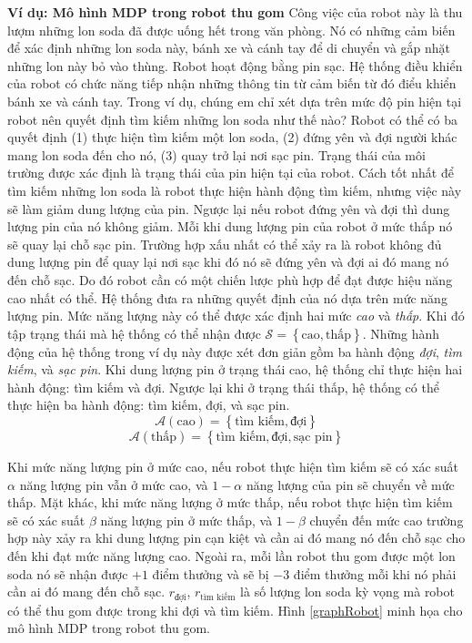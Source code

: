 \textbf{Ví dụ: Mô hình MDP trong robot thu gom} Công việc của robot này là thu lượm những lon soda đã được uống hết trong văn phòng. Nó có những cảm biến để xác định những lon soda này, bánh xe và cánh tay để di chuyển và gắp nhặt những lon này bỏ vào thùng. Robot hoạt động bằng pin sạc. Hệ thống điều khiển của robot có chức năng tiếp nhận những thông tin từ cảm biến từ đó điểu khiển bánh xe và cánh tay. Trong ví dụ, chúng em chỉ xét dựa trên mức độ pin hiện tại robot nên quyết định tìm kiếm những lon soda như thế nào? Robot có thể có ba quyết định (1) thực hiện tìm kiếm một lon soda, (2) đứng yên và đợi người khác mang lon soda đến cho nó, (3) quay trở lại nơi sạc pin. Trạng thái của môi trường được xác định là trạng thái của pin hiện tại của robot. Cách tốt nhất để tìm kiếm những lon soda là robot thực hiện hành động tìm kiếm, nhưng việc này sẽ làm giảm dung lượng của pin. Ngược lại nếu robot đứng yên và đợi thì dung lượng pin của nó không giảm. Mỗi khi dung lượng pin của robot ở mức thấp nó sẽ quay lại chỗ sạc pin. Trường hợp xấu nhất có thể xảy ra là robot không đủ dung lượng pin để quay lại nơi sạc khi đó nó sẽ đứng yên và đợi ai đó mang nó đến chỗ sạc. Do đó robot cần có một chiến lược phù hợp để đạt được hiệu năng cao nhất có thể.
Hệ thống đưa ra những quyết định của nó dựa trên mức năng lượng pin. Mức năng lượng này có thể được xác định hai mức \textit{cao} và \textit{thấp}. Khi đó tập trạng thái mà hệ thống có thể nhận được $\mathcal{S} = \left \{\text{cao}, \text{thấp} \right \}$. Những hành động của hệ thống trong ví dụ này được xét đơn giản gồm ba hành động \textit{đợi}, \textit{tìm kiếm}, và \textit{sạc pin}. Khi dung lượng pin ở trạng thái cao, hệ thống chỉ thực hiện hai hành động: tìm kiếm và đợi. Ngược lại khi ở trạng thái thấp, hệ thống có thể thực hiện ba hành động: tìm kiếm, đợi, và sạc pin.
$$\mathcal{A}(\text{cao}) =  \left \{\text{tìm kiếm}, \text{đợi} \right \}$$
$$\mathcal{A}(\text{thấp}) =  \left \{\text{tìm kiếm}, \text{đợi}, \text{sạc pin} \right \}$$

Khi mức năng lượng pin ở mức cao, nếu robot thực hiện tìm kiếm sẽ có xác suất $\alpha$ năng lượng pin vẫn ở mức cao, và $1 - \alpha$ năng lượng của pin sẽ chuyển về mức thấp. Mặt khác, khi mức năng lượng ở mức thấp, nếu robot thực hiện tìm kiếm sẽ có xác suất $\beta$ năng lượng pin ở mức thấp, và $1 - \beta$ chuyển đến mức cao trường hợp này xảy ra khi dung lượng pin cạn kiệt và cần ai đó mang nó đến chỗ sạc cho đến khi đạt mức năng lượng cao. Ngoài ra, mỗi lần robot thu gom được một lon soda nó sẽ nhận được $+1$ điểm thưởng và sẽ bị $-3$ điểm thưởng mỗi khi nó phải cần ai đó mang đến chỗ sạc. $r_{\text{đợi}}$, $r_{\text{tìm kiếm}}$ là số lượng lon soda kỳ vọng mà robot có thể thu gom được trong khi đợi và tìm kiếm. Hình \ref{graphRobot} minh họa cho mô hình MDP trong robot thu gom.

